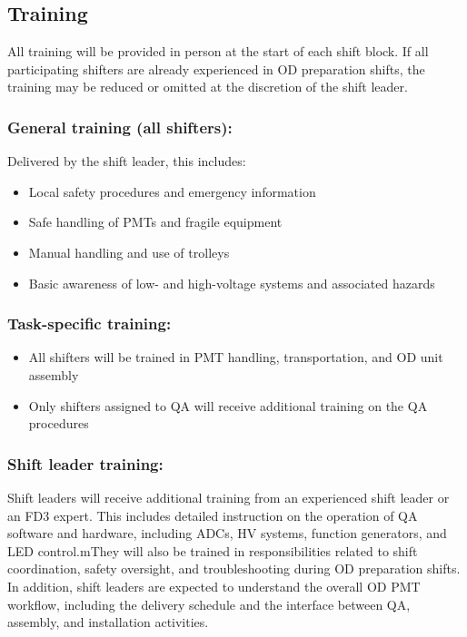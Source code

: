 \documentclass[12pt,a4paper]{article}
\begin{document}
\subsection{Training} \label{sec:training}
All training will be provided in person at the start of each shift block. If all participating shifters are already experienced in OD preparation shifts, the training may be reduced or omitted at the discretion of the shift leader.

\subsubsection*{General training (all shifters):}
Delivered by the shift leader, this includes:
\begin{itemize}
    \item Local safety procedures and emergency information
    \item Safe handling of PMTs and fragile equipment
    \item Manual handling and use of trolleys
    \item Basic awareness of low- and high-voltage systems and associated hazards
\end{itemize}

\subsubsection*{Task-specific training:}
\begin{itemize}
    \item All shifters will be trained in PMT handling, transportation, and OD unit assembly
    \item Only shifters assigned to QA will receive additional training on the QA procedures
\end{itemize}

\subsubsection*{Shift leader training:}
Shift leaders will receive additional training from an experienced shift leader or an FD3 expert. This includes detailed instruction on the operation of QA software and hardware, including ADCs, HV systems, function generators, and LED control.mThey will also be trained in responsibilities related to shift coordination, safety oversight, and troubleshooting during OD preparation shifts. In addition, shift leaders are expected to understand the overall OD PMT workflow, including the delivery schedule and the interface between QA, assembly, and installation activities.
\end{document}
